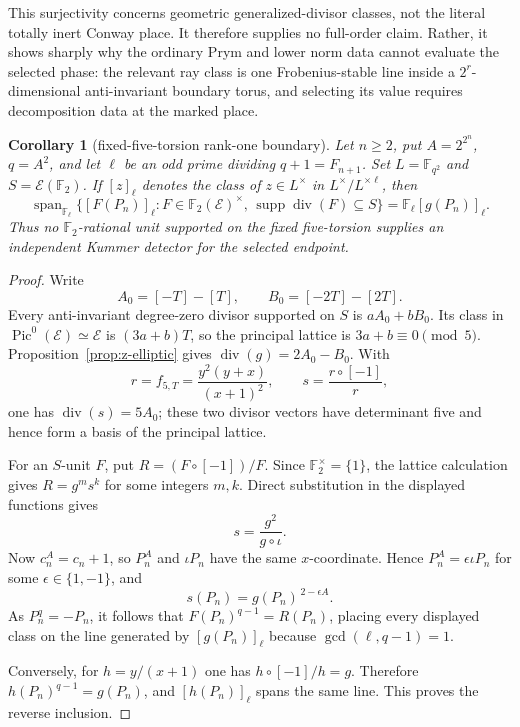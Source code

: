 \documentclass[11pt]{article}
\newtheorem{corollary}[theorem]{Corollary}
\theoremstyle{definition}
\theoremstyle{remark}
\begin{document}
This surjectivity concerns geometric generalized-divisor classes, not the
literal totally inert Conway place.  It therefore supplies no full-order
claim.  Rather, it shows sharply why the ordinary Prym and lower norm data
cannot evaluate the selected phase: the relevant ray class is one
Frobenius-stable line inside a $2^r$-dimensional anti-invariant boundary
torus, and selecting its value requires decomposition data at the marked
place.

\begin{corollary}[fixed-five-torsion rank-one boundary]
\label{cor:z-fixed-s-rank-one}
Let $n\geq2$, put $A=2^{2^n}$, $q=A^2$, and let
$\ell$ be an odd prime dividing $q+1=F_{n+1}$.  Set
$L=\mathbb F_{q^2}$ and $S=\mathcal E(\mathbb F_2)$.  If $[z]_\ell$
denotes the class of $z\in L^\times$ in
$L^\times/L^{\times\ell}$, then
\[
 \operatorname{span}_{\mathbb F_\ell}
 \bigl\{[F(P_n)]_\ell:
 F\in\mathbb F_2(\mathcal E)^\times,\,
 \operatorname{supp}\operatorname{div}(F)\subseteq S\bigr\}
 =
 \mathbb F_\ell[g(P_n)]_\ell .
\]
Thus no $\mathbb F_2$-rational unit supported on the fixed five-torsion
supplies an independent Kummer detector for the selected endpoint.
\end{corollary}

\begin{proof}
Write
\[
 A_0=[-T]-[T],\qquad B_0=[-2T]-[2T].
\]
Every anti-invariant degree-zero divisor supported on $S$ is $aA_0+bB_0$.
Its class in $\operatorname{Pic}^0(\mathcal E)\simeq\mathcal E$ is
$(3a+b)T$, so the principal lattice is
$3a+b\equiv0\pmod5$.  Proposition~\ref{prop:z-elliptic} gives
$\operatorname{div}(g)=2A_0-B_0$.  With
\[
 r=f_{5,T}=\frac{y^2(y+x)}{(x+1)^2},
 \qquad s=\frac{r\circ[-1]}r,
\]
one has $\operatorname{div}(s)=5A_0$; these two divisor vectors have
determinant five and hence form a basis of the principal lattice.

For an $S$-unit $F$, put $R=(F\circ[-1])/F$.  Since
$\mathbb F_2^\times=\{1\}$, the lattice calculation gives
$R=g^m s^k$ for some integers $m,k$.  Direct substitution in the displayed
functions gives
\[
 s=\frac{g^2}{g\circ\iota}.
\]
Now $c_n^A=c_n+1$, so $P_n^A$ and $\iota P_n$ have the same
$x$-coordinate.  Hence $P_n^A=\epsilon\iota P_n$ for some
$\epsilon\in\{1,-1\}$, and
\[
 s(P_n)=g(P_n)^{\,2-\epsilon A}.
\]
As $P_n^q=-P_n$, it follows that
$F(P_n)^{q-1}=R(P_n)$, placing every displayed class on the line generated
by $[g(P_n)]_\ell$ because $\gcd(\ell,q-1)=1$.

Conversely, for $h=y/(x+1)$ one has
$h\circ[-1]/h=g$.  Therefore
$h(P_n)^{q-1}=g(P_n)$, and $[h(P_n)]_\ell$ spans the same line.  This proves
the reverse inclusion.
\end{proof}
\end{document}
